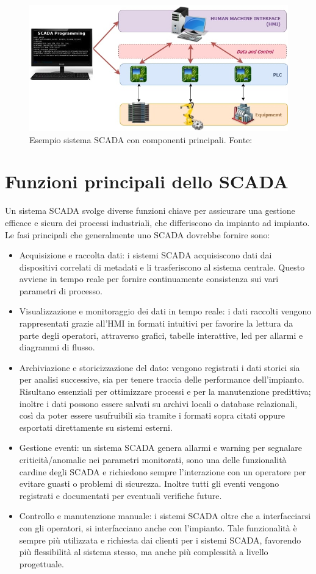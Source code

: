 \begin{figure}
    \centering
    \includegraphics[width=0.7\linewidth]{Immagini/SCADA_system.jpg}
    \caption{Esempio sistema SCADA con componenti principali. Fonte: \cite{exonsys_scada}}
    \label{fig:SCADA_system.jpg}
\end{figure}

\section{Funzioni principali dello SCADA}
Un sistema SCADA svolge diverse funzioni chiave per assicurare una gestione efficace e sicura dei processi industriali, che differiscono da impianto ad impianto. Le fasi principali che generalmente uno SCADA dovrebbe fornire sono:
\begin{itemize}
    \item Acquisizione e raccolta dati: i sistemi SCADA acquisiscono dati dai dispositivi correlati di metadati e li trasferiscono al sistema centrale. Questo avviene in tempo reale per fornire continuamente consistenza sui vari parametri di processo.
    \item Visualizzazione e monitoraggio dei dati in tempo reale: i dati raccolti vengono rappresentati grazie all'HMI in formati intuitivi per favorire la lettura da parte degli operatori, attraverso grafici, tabelle interattive, led per allarmi e diagrammi di flusso.
    \item Archiviazione e storicizzazione del dato: vengono registrati i dati storici sia per analisi successive, sia per tenere traccia delle performance dell'impianto. Risultano essenziali per ottimizzare processi e per la manutenzione predittiva; inoltre i dati possono essere salvati su archivi locali o database relazionali, così da poter essere usufruibili sia tramite i formati sopra citati oppure esportati direttamente su sistemi esterni.
    \item Gestione eventi: un sistema SCADA genera allarmi e warning per segnalare criticità/anomalie nei parametri monitorati, sono una delle funzionalità cardine degli SCADA e richiedono sempre l'interazione con un operatore per evitare guasti o problemi di sicurezza. Inoltre tutti gli eventi vengono registrati e documentati per eventuali verifiche future.
    \item Controllo e manutenzione manuale: i sistemi SCADA oltre che a interfacciarsi con gli operatori, si interfacciano anche con l'impianto. Tale funzionalità è sempre più utilizzata e richiesta dai clienti per i sistemi SCADA, favorendo più flessibilità al sistema stesso, ma anche più complessità a livello progettuale.
\end{itemize}
